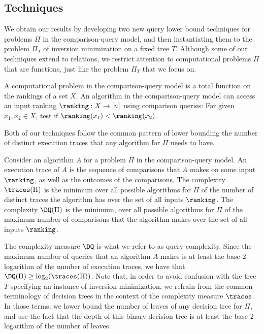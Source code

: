 \documentclass{toc}
\begin{document}
\subsection{Techniques} 
%
We obtain our results by developing two new query lower bound techniques for
%
problems $\Pi$ in the comparison-query model, and then instantiating them to the problem $\Pi_T$ of inversion minimization on a fixed tree $T$. Although some of our techniques extend to relations, we restrict attention to computational problems $\Pi$ that are functions, %
%
just like the problem $\Pi_T$ that we focus on.
\begin{definition}
\label{def:computational-problem}
A computational problem in the comparison-query model is a total function on the rankings of a set $X$. An algorithm in the comparison-query model can access an input ranking $\ranking: X \to [n]$ using comparison queries: For given $x_1,x_2 \in X$, test if $\ranking(x_1)< \ranking(x_2)$.
\end{definition}

Both of our techniques follow the common pattern of lower bounding the number of distinct execution traces that any algorithm for $\Pi$ needs to have.
\begin{definition}
\label{def:execution-and-deterministic}
Consider an algorithm $A$ for a problem $\Pi$ in the comparison-query model. An execution trace of $A$ is the sequence of comparisons that $A$ makes on some input $\ranking$, as well as the outcomes of the comparisons. The complexity $\traces(\Pi)$ is the minimum over all possible algorithms for $\Pi$ of the number of distinct traces the algorithm has over the set of all inputs $\ranking$. The complexity $\DQ(\Pi)$ is the minimum, over all possible algorithms for $\Pi$ of the maximum number of comparisons that the algorithm makes over the set of all inputs $\ranking$.
\end{definition}
The complexity measure $\DQ$ is what we refer to as query complexity. Since the maximum number of queries that an algorithm $A$ makes is at least the base-2 logarithm of the number of execution traces, we have that $\DQ(\Pi) \ge \log_2(\traces(\Pi))$. 
Note that, in order to avoid confusion with the tree $T$ specifying an instance of inversion minimization, we refrain from the common terminology of decision trees in the context of the complexity measure $\traces$. In those terms, we lower bound the number of leaves of any decision tree for $\Pi$, and use the fact that the depth of this binary decision tree is at least the base-2 logarithm of the number of leaves.
\end{document}
